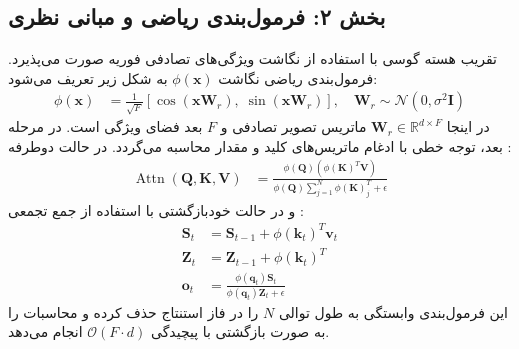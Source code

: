 \subsection*{بخش ۲: فرمول‌بندی ریاضی و مبانی نظری }
تقریب هسته گوسی با استفاده از نگاشت ویژگی‌های تصادفی فوریه صورت می‌پذیرد. فرمول‌بندی ریاضی نگاشت $\phi(\mathbf{x})$ به شکل زیر تعریف می‌شود:
\begin{align}
\phi(\mathbf{x}) &= \frac{1}{\sqrt{F}} \left[ \cos(\mathbf{x} \mathbf{W}_r), \; \sin(\mathbf{x} \mathbf{W}_r) \right], \quad \mathbf{W}_r \sim \mathcal{N}(0, \sigma^2 \mathbf{I})
\end{align}
در اینجا $\mathbf{W}_r \in \mathbb{R}^{d \times F}$ ماتریس تصویر تصادفی و $F$ بعد فضای ویژگی  است.
در مرحله بعد، توجه خطی با ادغام ماتریس‌های کلید و مقدار محاسبه می‌گردد. در حالت دوطرفه :
\begin{align}
\operatorname{Attn}(\mathbf{Q}, \mathbf{K}, \mathbf{V}) &= \frac{\phi(\mathbf{Q}) \left(\phi(\mathbf{K})^T \mathbf{V}\right)}{\phi(\mathbf{Q}) \sum_{j=1}^N \phi(\mathbf{K})_j^T + \epsilon}
\end{align}
و در حالت خودبازگشتی  با استفاده از جمع تجمعی :
\begin{align}
\mathbf{S}_t &= \mathbf{S}_{t-1} + \phi(\mathbf{k}_t)^T \mathbf{v}_t \\
\mathbf{Z}_t &= \mathbf{Z}_{t-1} + \phi(\mathbf{k}_t)^T \\
\mathbf{o}_t &= \frac{\phi(\mathbf{q}_t) \mathbf{S}_t}{\phi(\mathbf{q}_t) \mathbf{Z}_t + \epsilon}
\end{align}
این فرمول‌بندی وابستگی به طول توالی $N$ را در فاز استنتاج حذف کرده و محاسبات را به صورت بازگشتی با پیچیدگی $\mathcal{O}(F \cdot d)$ انجام می‌دهد.

